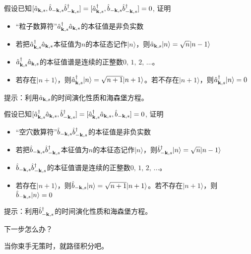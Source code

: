 \documentclass[CJK]{beamer}
\begin{document}
\begin{frame}
\bch
假设已知$[{\hat{a}}_{{\mathbf{k}},s},{\hat{b}}_{-{\mathbf{k}},s}{\hat{b}^\dagger}_{-{\mathbf{k}},s}]=[{\hat{a}^\dagger}_{{\mathbf{k}},s},{\hat{b}}_{-{\mathbf{k}},s}{\hat{b}^\dagger}_{-{\mathbf{k}},s}]=0$, 证明

\begin{itemize}
\item{“粒子数算符”${\hat{a}^\dagger}_{{\mathbf{k}},s}{\hat{a}}_{{\mathbf{k}},s}$的本征值是非负实数}
\item{若把${\hat{a}^\dagger}_{{\mathbf{k}},s}{\hat{a}}_{{\mathbf{k}},s}$本征值为$n$的本征态记作$|n\rangle$，则${\hat{a}}_{{\mathbf{k}},s}|n\rangle = \sqrt{n}|n-1\rangle$}
\item{${\hat{a}^\dagger}_{{\mathbf{k}},s}{\hat{a}}_{{\mathbf{k}},s}$的本征值谱是连续的正整数$0,\, 1,\, 2,\, \ldots$。}
\item{若存在$|n+1\rangle$，则${\hat{a}^\dagger}_{{\mathbf{k}},s}|n\rangle = \sqrt{n+1}|n+1\rangle$。若不存在$|n+1\rangle$，则${\hat{a}^\dagger}_{{\mathbf{k}},s}|n\rangle =0$}
\end{itemize}

\skipline

提示：利用${\hat{a}}_{{\mathbf{k}},s}$的时间演化性质和海森堡方程。
\ech
\end{frame}


\begin{frame}
\bch
假设已知$[{\hat{a}^\dagger}_{{\mathbf{k}},s}{\hat{a}}_{{\mathbf{k}},s},{\hat{b}^\dagger}_{-{\mathbf{k}},s}]=[{\hat{a}^\dagger}_{{\mathbf{k}},s}{\hat{a}}_{{\mathbf{k}},s},{\hat{b}}_{-{\mathbf{k}},s}]=0$, 证明

\begin{itemize}
\item{“空穴数算符”${\hat{b}}_{-{\mathbf{k}},s}{\hat{b}^\dagger}_{-{\mathbf{k}},s}$的本征值是非负实数}
\item{若把${\hat{b}}_{-{\mathbf{k}},s}{\hat{b}^\dagger}_{-{\mathbf{k}},s}$本征值为$n$的本征态记作$|n\rangle$，则${\hat{b}^\dagger}_{-{\mathbf{k}},s}|n\rangle = \sqrt{n}|n-1\rangle$}
\item{${\hat{b}}_{-{\mathbf{k}},s}{\hat{b}^\dagger}_{-{\mathbf{k}},s}$的本征值谱是连续的正整数$0,\, 1,\, 2,\, \ldots$。}
\item{若存在$|n+1\rangle$，则${\hat{b}}_{-{\mathbf{k}},s}|n\rangle = \sqrt{n+1}|n+1\rangle$。若不存在$|n+1\rangle$，则${\hat{b}}_{-{\mathbf{k}},s}|n\rangle =0$}
\end{itemize}

\skipline

提示：利用${\hat{b}^\dagger}_{-{\mathbf{k}},s}$的时间演化性质和海森堡方程。
\ech
\end{frame}


\begin{frame}
\bch
下一步怎么办？
\ech
\end{frame}


\begin{frame}
\bch
当你束手无策时，就路径积分吧。
\ech
\end{frame}
\end{document}
